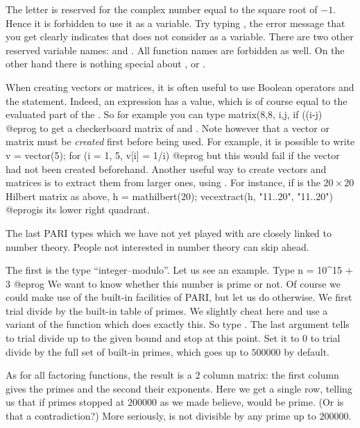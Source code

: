  The letter  is reserved for the complex number
equal to the square root of $-1$. Hence it is forbidden to use it as a
variable. Try typing , the error message that you
get clearly indicates that  does not consider  as a variable.
There are two other reserved variable names:  and . All
function names are forbidden as well. On the other hand there is nothing
special about ,  or .

When creating vectors or matrices, it is often useful to use Boolean
operators and the  statement. Indeed, an  expression has a
value, which is of course equal to the evaluated part of the . So for
example you can type
\bprog
  matrix(8,8, i,j, if ((i-j)%
@eprog\noindent
to get a checkerboard matrix of  and . Note however
that a vector or matrix must be \emph{created} first before being used. For
example, it is possible to write
\bprog
  v = vector(5);
  for (i = 1, 5, v[i] = 1/i)
@eprog\noindent
but this would fail if the vector  had not been created beforehand.
Another useful way to create vectors and matrices is to extract them from
larger ones, using . For instance, if  is the
$20\times 20$ Hilbert matrix as above,
\bprog
  h = mathilbert(20);
  vecextract(h, "11..20", "11..20")
@eprog\noindent is its lower right quadrant.

\medskip The last PARI types which we have not yet played with are closely
linked to number theory. People not interested in number theory can skip
ahead.

The first is the type ``integer--modulo''. Let us see an example. Type
\bprog
  n = 10^15 + 3
@eprog
We want to know whether this number is prime or not. Of course we could make
use of the built-in facilities of PARI, but let us do otherwise. We first
trial divide by the built-in table of primes. We slightly cheat here and use
a variant of the function  which does exactly this. So type
. The last argument tells  to trial divide
up to the given bound and stop at this point. Set it to 0 to trial divide by
the full set of built-in primes, which goes up to $500000$ by default.

As for all factoring functions, the result is a 2 column matrix: the first
column gives the primes and the second their exponents. Here we get a single
row, telling us that if primes stopped at $200000$ as we made 
believe,  would be prime. (Or is that a contradiction?) More
seriously,  is not divisible by any prime up to $200000$.

